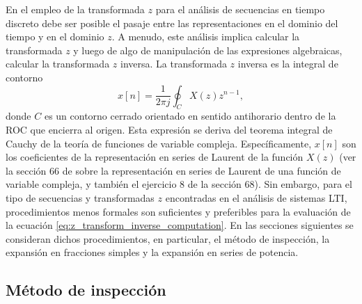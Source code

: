 \documentclass[a4paper]{report}
\begin{document}
En el empleo de la transformada \(z\) para el análisis de secuencias en tiempo discreto debe ser posible el pasaje entre las representaciones en el dominio del tiempo y en el dominio \(z\). A menudo, este análisis implica calcular la transformada \(z\) y luego de algo de manipulación de las expresiones algebraicas, calcular la transformada \(z\) inversa. La transformada \(z\) inversa es la integral de contorno
\begin{equation}\label{eq:z_transform_inverse_computation}
 x[n]=\frac{1}{2\pi j}\oint_C X(z)z^{n-1}, 
\end{equation}
donde \(C\) es un contorno cerrado orientado en sentido antihorario dentro de la ROC que encierra al origen. Esta expresión se deriva del teorema integral de Cauchy de la teoría de funciones de variable compleja. Específicamente, \(x[n]\) son los coeficientes de la representación en series de Laurent de la función \(X(z)\) (ver la sección 66 de \cite{brown2013complex} sobre la representación en series de Laurent de una función de variable compleja, y también el ejercicio 8 de la sección 68). Sin embargo, para el tipo de secuencias y transformadas \(z\) encontradas en el análisis de sistemas LTI, procedimientos menos formales son suficientes y preferibles para la evaluación de la ecuación  \ref{eq:z_transform_inverse_computation}. En las secciones siguientes se consideran dichos procedimientos, en particular, el método de inspección, la expansión en fracciones simples y la expansión en series de potencia.

\subsection{Método de inspección}
\end{document}
